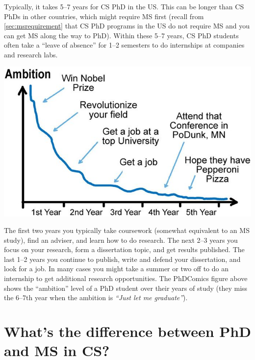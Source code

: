 \documentclass[oneside,11pt,dvipsnames]{book}
\newenvironment{commentbox}[1][]{
  \small
  \begin{mybox}
    {\small \textbf{#1}}
  }{
  \end{mybox}
}
\begin{document}
Typically, it takes 5--7 years for CS PhD in the US.  This can be longer than CS PhDs in other countries, which might require MS first (recall from \autoref{sec:msrequirement} that CS PhD programs in the US do not require MS and you can get MS along the way to PhD). Within these 5--7 years, CS PhD students often take a ``leave of absence'' for 1--2 semesters to do internships at companies and research labs.


\begin{center}
  \includegraphics[scale=0.5]{files/c4a.png}
\end{center}

The first two years you typically take coursework (somewhat equivalent to an MS study), find an adviser, and learn how to do research.  The next 2--3 years you focus on your research, form a dissertation topic, and get results published. The last 1--2 years you continue to publish, write and defend your dissertation, and look for a job.
In many cases you might take a summer or two off to do an internship to get additional research opportunities.
The PhDComics figure above shows the ``ambition'' level of a PhD student over their years of study (they miss the 6--7th year when the ambition is \emph{``Just let me graduate''}).






\section{What's the difference between PhD and MS in CS?}\label{sec:phd-vs-ms}
\end{document}
